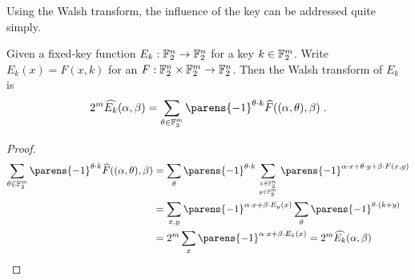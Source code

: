 Using the Walsh transform, the influence of the key can be addressed quite simply.
\begin{lemma}\label{lem:keyed-func}
    Given a fixed-key function $E_k : \mathbb{F}_2^n \to \mathbb{F}_2^n$ for a key $k \in \mathbb{F}_2^m$.
    Write $E_k(x) = F(x, k)$ for an $F : \mathbb{F}_2^n \times \mathbb{F}_2^m \to \mathbb{F}_2^n$.
    Then the Walsh transform of $E_k$ is
    \begin{equation*}
        2^m \FC{E_k}(\alpha, \beta) = \sum_{\theta \in \F_2^m} \parens{-1}^{\iprod{\theta}{k}} \FC{F}((\alpha, \theta), \beta)\;.
    \end{equation*}
\end{lemma}
\begin{proof}
    \begin{align*}
           \sum_{\theta \in \F_2^m} \parens{-1}^{\iprod{\theta}{k}} \FC{F}((\alpha, \theta), \beta)
        &= \sum_{\theta} \parens{-1}^{\iprod{\theta}{k}} \sum_{\tower{x \in \F_2^n}{y \in \F_2^m}} \parens{-1}^{\iprod{\alpha}{x} + \iprod{\theta}{y} + \iprod{\beta}{F(x,y)}} \\
        &= \sum_{x, y} \parens{-1}^{\iprod{\alpha}{x} + \iprod{\beta}{E_y(x)}} \sum_{\theta} \parens{-1}^{\iprod{\theta}{(k+y)}} \\
        &= 2^m \sum_{x} \parens{-1}^{\iprod{\alpha}{x} + \iprod{\beta}{E_k(x)}}
         = 2^m \FC{E_k}(\alpha, \beta)
    \end{align*}
\end{proof}

